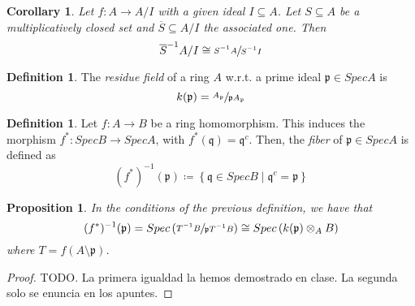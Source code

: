 \documentclass[11pt]{article}
\newtheorem{corollary}{Corollary}[theorem]
\newtheorem{prop}[theorem]{Proposition}
\theoremstyle{definition}
\newtheorem{defn}[theorem]{Definition}
\begin{document}
        \begin{corollary}
            Let $f:A \longrightarrow A/I$ with a given ideal $I \subseteq A$.
            Let $S \subseteq A$ be a multiplicatively closed set and $\overline{S} \subseteq A/I$ the associated one.
            Then
            \[
                \overline{S}^{-1}A/I \cong \sfrac{S^{-1}A}{S^{-1}I}  %
            \]
        \end{corollary}

        \begin{defn}
            The \emph{residue field} of a ring $A$ w.r.t. a prime ideal $\mathfrak{p} \in SpecA$ is
            \[
                k(\mathfrak{p}) = \sfrac{A_{\mathfrak{p}}}{\mathfrak{p}A_{\mathfrak{p}}}
            \]
        \end{defn}

        \begin{defn}
            Let $f: A \longrightarrow B$ be a ring homomorphism.
            This induces the morphism $f^*: SpecB \longrightarrow Spec A$, with $f^*(\mathfrak{q}) = \mathfrak{q}^c$.
            Then, the \emph{fiber} of $\mathfrak{p} \in SpecA$ is defined as
            \[
                (f^*)^{-1}(\mathfrak{p}) \coloneqq \left\{ \mathfrak{q} \in SpecB \mid \mathfrak{q}^c = \mathfrak{p} \right\}
            \]
        \end{defn}

        \begin{prop}
            In the conditions of the previous definition, we have that
            \[
                (f^*)^{-1}(\mathfrak{p}) = Spec \left( \sfrac{T^{-1}B}{\mathfrak{p}T^{-1}B} \right) \cong Spec\left( k(\mathfrak{p}) \otimes_A B \right)
            \]
            where $T = f(A \setminus \mathfrak{p})$.
        \end{prop}
            \begin{proof}

                TODO. La primera igualdad la hemos demostrado en clase.
                La segunda solo se enuncia en los apuntes.

            \end{proof}
    
\end{document}

